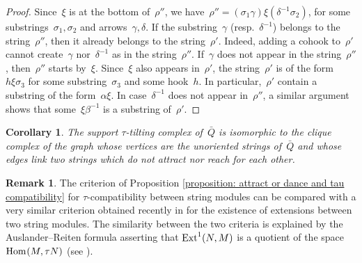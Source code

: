 \documentclass{memo-l}
\newtheorem{corollary}[theorem]{Corollary}
\theoremstyle{definition}
\newtheorem{remark}[theorem]{Remark}
\newcommand{\Hom}[1]{\operatorname{{\rm Hom}}_{#1}}
\newcommand{\Ext}[1]{\operatorname{{\rm Ext}}_{#1}}
\begin{document}
\begin{proof}
 Since~$\xi$ is at the bottom of~$\rho''$, we have~$\rho''=(\sigma_1\gamma)\xi(\delta^{-1}\sigma_2)$, for some substrings~$\sigma_1,\sigma_2$ and arrows~$\gamma,\delta$.
 If the substring~$\gamma$ (resp.~$\delta^{-1}$) belongs to the string~$\rho''$, then it already belongs to the string~$\rho'$.
 Indeed, adding a cohook to~$\rho'$ cannot create~$\gamma$ nor~$\delta^{-1}$ as in the string~$\rho''$.
 If~$\gamma$ does not appear in the string~$\rho''$, then~$\rho''$ starts by~$\xi$.
 Since~$\xi$ also appears in~$\rho'$, the string~$\rho'$ is of the form~$h\xi\sigma_3$ for some substring~$\sigma_3$ and some hook~$h$.
 In particular,~$\rho'$ contain a substring of the form~$\alpha\xi$.
 In case~$\delta^{-1}$ does not appear in~$\rho''$, a similar argument shows that some~$\xi\beta^{-1}$ is a substring of~$\rho'$.
\end{proof}

\begin{corollary}
\label{coro: stautilt complex from strings}
The support $\tau$-tilting complex of~$\bar Q$ is isomorphic to the clique complex of the graph whose vertices are the unoriented strings of~$\bar Q$ and whose edges link two strings which do not attract nor reach for each other.
\end{corollary}

\begin{remark}
The criterion of Proposition \ref{proposition: attract or dance and tau compatibility} for $\tau$-compatibility between string modules can be compared with a very similar criterion obtained recently in \cite{CanakciPauksztelloSchroll} for the existence of extensions between two string modules.
The similarity between the two criteria is explained by the Auslander--Reiten formula asserting that $\Ext{}^1(N,M)$ is a quotient of the space $\Hom{}(M,\tau N)$ (see \cite[Thm.~IV.2.13]{AssemSimsonSkowronski}).
\end{remark}
\end{document}
